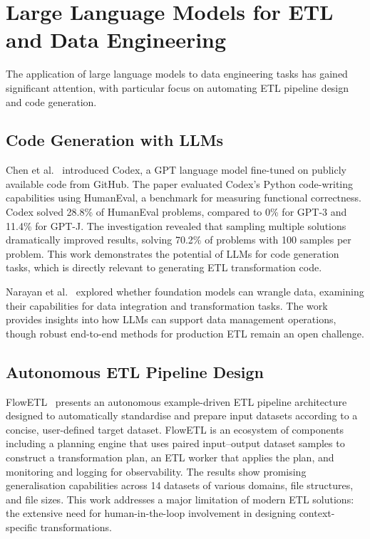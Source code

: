 \section{Large Language Models for ETL and Data Engineering}
\label{sec:related-llm-etl}

The application of large language models to data engineering tasks has gained significant attention, with particular focus on automating ETL pipeline design and code generation.

\subsection{Code Generation with LLMs}

Chen et al.~\cite{chen2021evaluating} introduced Codex, a GPT language model fine-tuned on publicly available code from GitHub. The paper evaluated Codex's Python code-writing capabilities using HumanEval, a benchmark for measuring functional correctness. Codex solved 28.8\% of HumanEval problems, compared to 0\% for GPT-3 and 11.4\% for GPT-J. The investigation revealed that sampling multiple solutions dramatically improved results, solving 70.2\% of problems with 100 samples per problem. This work demonstrates the potential of LLMs for code generation tasks, which is directly relevant to generating ETL transformation code.

Narayan et al.~\cite{narayan2022foundation} explored whether foundation models can wrangle data, examining their capabilities for data integration and transformation tasks. The work provides insights into how LLMs can support data management operations, though robust end-to-end methods for production ETL remain an open challenge.

\subsection{Autonomous ETL Pipeline Design}

FlowETL~\cite{diprofio2025flowetl} presents an autonomous example-driven ETL pipeline architecture designed to automatically standardise and prepare input datasets according to a concise, user-defined target dataset. FlowETL is an ecosystem of components including a planning engine that uses paired input--output dataset samples to construct a transformation plan, an ETL worker that applies the plan, and monitoring and logging for observability. The results show promising generalisation capabilities across 14 datasets of various domains, file structures, and file sizes. This work addresses a major limitation of modern ETL solutions: the extensive need for human-in-the-loop involvement in designing context-specific transformations.


